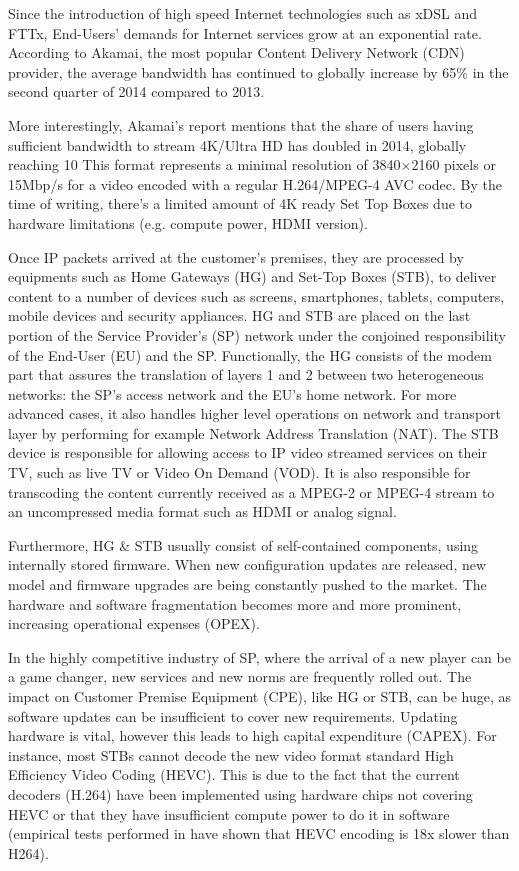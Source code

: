 Since the introduction of high speed Internet technologies such as xDSL and FTTx, End-Users’ demands for Internet services grow at an exponential rate.
According to Akamai, the most popular Content Delivery Network (CDN) provider, the average bandwidth has continued to globally increase by 65\% in the second quarter of 2014 \cite{_akamais_2014} compared to 2013.

More interestingly, Akamai’s report mentions that the share of users having sufficient bandwidth to stream 4K/Ultra HD has doubled in 2014, globally reaching 10%
This format represents a minimal resolution of 3840×2160 pixels or 15Mbp/s for a video encoded with a regular H.264/MPEG-4 AVC codec.
By the time of writing, there’s a limited amount of 4K ready Set Top Boxes due to hardware limitations (e.g. compute power, HDMI version).

Once IP packets arrived at the customer’s premises, they are processed by equipments such as Home Gateways (HG) and Set-Top Boxes (STB), to deliver content to a number of devices such as screens, smartphones, tablets, computers, mobile devices and security appliances.
HG and STB are placed on the last portion of the Service Provider’s (SP) network under the conjoined responsibility of the End-User (EU) and the SP.
Functionally, the HG consists of the modem part that assures the translation of layers 1 and 2 between two heterogeneous networks: the SP’s access network and the EU’s home network.
For more advanced cases, it also handles higher level operations on network and transport layer by performing for example Network Address Translation (NAT).
The STB device is responsible for allowing access to IP video streamed services on their TV, such as live TV or Video On Demand (VOD).
It is also responsible for transcoding the content currently received as a MPEG-2 or MPEG-4 stream to an uncompressed media format such as HDMI or analog signal.

Furthermore, HG & STB usually consist of self-contained components, using internally stored firmware.
When new configuration updates are released, new model and firmware upgrades are being constantly pushed to the market.
The hardware and software fragmentation becomes more and more prominent, increasing operational expenses (OPEX). 

In the highly competitive industry of SP, where the arrival of a new player can be a game changer, new services and new norms are frequently rolled out.
The impact on Customer Premise Equipment (CPE), like HG or STB, can be huge, as software updates can be insufficient to cover new requirements.
Updating hardware is vital, however this leads to high capital expenditure (CAPEX).
For instance, most STBs cannot decode the new video format standard  High Efficiency Video Coding (HEVC).
This is due to the fact that the current decoders (H.264) have been implemented using hardware chips not covering HEVC or that they have insufficient compute power to do it in software (empirical tests performed in \cite{grois_performance_2013} have shown that HEVC encoding is 18x slower than H264).

